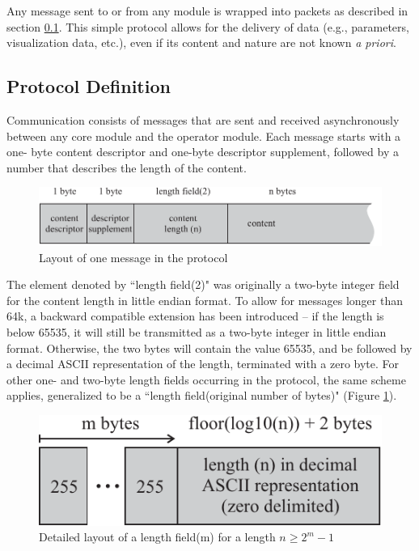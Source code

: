 \documentclass[letterpaper,oneside,12pt]{book}
\begin{document}
Any message sent to or from any module is wrapped into packets as described in 
section \ref{protocol_definition}. This simple protocol allows for the delivery 
of data (e.g., parameters, visualization data, etc.), even if its content and 
nature are not known \textit{a priori}.


\subsection{Protocol Definition}
\label{protocol_definition}

Communication consists of messages that are sent and received asynchronously 
between any core module and the operator module. Each message starts with a one-
byte content descriptor and one-byte descriptor supplement, followed by a number that describes the length of the content.

\begin{figure}[ht]
 \centerline{\includegraphics{figures/operator_prot}}
 \caption{Layout of one message in the protocol}
\end{figure}

The element denoted by ``length field(2)" was originally a two-byte integer field
for the content length in little endian format.
To allow for messages longer than 64k, a backward compatible extension has been introduced -- if the length is below 65535, it will still be transmitted as a two-byte integer in little endian format. Otherwise, the two bytes will contain the value 65535, and be followed by a decimal ASCII representation of the length, terminated with a zero byte.
For other one- and two-byte length fields occurring in the protocol, the same scheme applies, generalized to be a ``length field(original number of bytes)" 
(Figure \ref{fig:length_field}).

\begin{figure}[ht]
 \centerline{\includegraphics{figures/length_field}}
 \caption{Detailed layout of a length field(m) for a length $n \geq 2^m-1$}
 \label{fig:length_field}
\end{figure}
\end{document}
